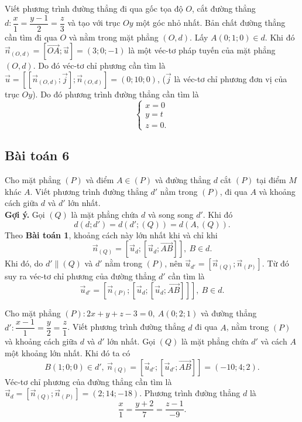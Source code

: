 \begin{vd}%
Viết phương trình đường thẳng đi qua gốc tọa độ $O$, cắt đường thẳng $d: \dfrac{x}{1}=\dfrac{y-1}{2}=\dfrac{z}{3}$ và tạo với trục $Oy$ một góc nhỏ nhất. 
\loigiai
{
Bản chất đường thẳng cần tìm đi qua $O$ và nằm trong mặt phẳng $(O,d)$. Lấy $A(0;1;0)\in d$. Khi đó $\vec{n}_{(O,d)}=\left[\vec{OA};\vec{u}\right]=(3;0;-1)$ là một véc-tơ pháp tuyến của mặt phẳng $(O,d)$.     
Do đó véc-tơ chỉ phương cần tìm là 
$\vec{u}=\left[\left[\vec{n}_{(O,d)};\vec{j}\right]; \vec{n}_{(O,d)}\right]=(0;10;0)$, ($\vec{j}$ là véc-tơ chỉ phương đơn vị của trục $Oy$). Do đó phương trình đường thẳng cần tìm là 
\[\begin{cases}
x=0\\
y=t\\
z=0.
\end{cases}\]
} 
\end{vd} 

\subsection{Bài toán 6}
Cho mặt phẳng $(P)$ và điểm $A\in (P)$ và đường thẳng $d$ cắt $(P)$ tại điểm $M$ khác $A$. Viết phương trình đường thẳng $d'$ nằm trong $(P)$, đi qua $A$ và khoảng cách giữa $d$ và $d'$ lớn nhất.\\
\textbf{Gợi ý.} Gọi $(Q)$ là mặt phẳng chứa $d$ và song song $d'$. Khi đó \[d(d;d')=d(d';(Q))=d(A,(Q)).\]
Theo \textbf{Bài toán 1}, khoảng cách này lớn nhất khi và chỉ khi 
\[\vec{n}_{(Q)}=\left[\vec{u}_d;\left[\vec{u}_d;\vec{AB}\right]\right],~B\in d.\]
Khi đó, do $d'\parallel(Q)$ và $d'$ nằm trong $(P)$, nên $\vec{u}_{d'}=\left[\vec{n}_{(Q)};\vec{n}_{(P)}\right]$. Từ đó suy ra véc-tơ chỉ phương  của đường thẳng $d'$ cần tìm là 
\[\vec{u}_{d'}=\left[\vec{n}_{(P)};\left[\vec{u}_d;\left[\vec{u}_d;\vec{AB}\right]\right]\right],~B\in d.\]
\begin{vd}%
Cho mặt phẳng $(P)\colon2x+y+z-3=0,~A(0;2;1)$ và đường thẳng $d'\colon\dfrac{x-1}{1}=\dfrac{y}{2}=\dfrac{z}{1}$. Viết phương trình đường thẳng $d$ đi qua $A$, nằm trong $(P)$ và khoảng cách giữa $d$ và $d'$ lớn nhất.
\loigiai
{
Gọi $(Q)$ là mặt phẳng chứa $d'$ và cách $A$ một khoảng lớn nhất. Khi đó ta có
\[B(1;0;0)\in d',~\vec{n}_{(Q)}=\left[\vec{u}_{d'};\left[\vec{u}_{d'};\vec{AB}\right]\right]=(-10;4;2).\]
Véc-tơ chỉ phương của đường thẳng cần tìm là $\vec{u}_d=\left[\vec{n}_{(Q)};\vec{n}_{(P)}\right]=(2;14;-18)$. Phương trình đường thẳng $d$ là
\[\dfrac{x}{1}=\dfrac{y+2}{7}=\dfrac{z-1}{-9}.\]
}
\end{vd}
